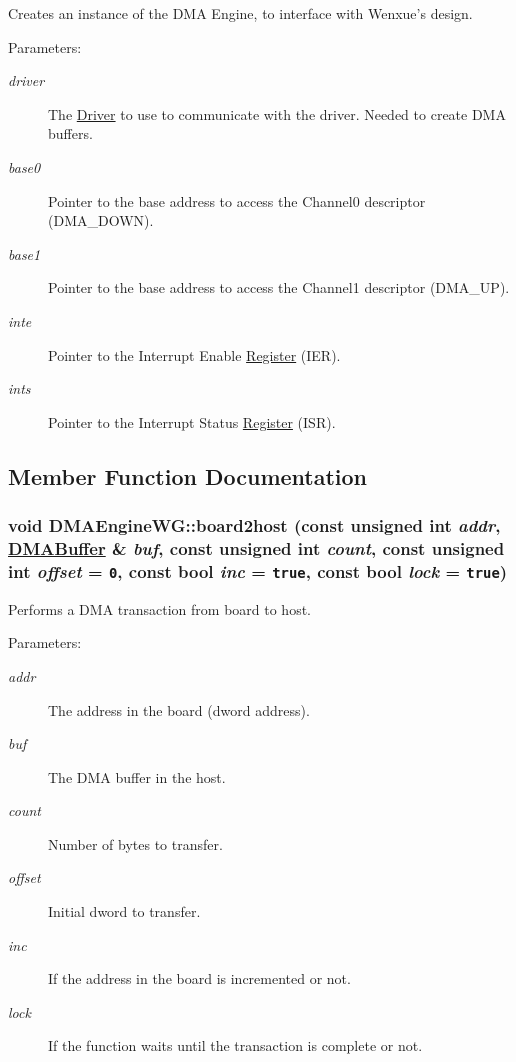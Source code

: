 Creates an instance of the DMA Engine, to interface with Wenxue's design. 

\begin{Desc}
\item[Parameters:]
\begin{description}
\item[{\em driver}]The \hyperlink{classmprace_1_1Driver}{Driver} to use to communicate with the driver. Needed to create DMA buffers. \item[{\em base0}]Pointer to the base address to access the Channel0 descriptor (DMA\_\-DOWN). \item[{\em base1}]Pointer to the base address to access the Channel1 descriptor (DMA\_\-UP). \item[{\em inte}]Pointer to the Interrupt Enable \hyperlink{classmprace_1_1Register}{Register} (IER). \item[{\em ints}]Pointer to the Interrupt Status \hyperlink{classmprace_1_1Register}{Register} (ISR).\end{description}
\end{Desc}


\subsection{Member Function Documentation}
\hypertarget{classmprace_1_1DMAEngineWG_a5}{
\subsubsection[board2host]{\setlength{\rightskip}{0pt plus 5cm}void DMAEngine\-WG::board2host (const unsigned int {\em addr}, \hyperlink{classmprace_1_1DMABuffer}{DMABuffer} \& {\em buf}, const unsigned int {\em count}, const unsigned int {\em offset} = {\tt 0}, const bool {\em inc} = {\tt true}, const bool {\em lock} = {\tt true})}}
\label{classmprace_1_1DMAEngineWG_a5}


Performs a DMA transaction from board to host. 

\begin{Desc}
\item[Parameters:]
\begin{description}
\item[{\em addr}]The address in the board (dword address). \item[{\em buf}]The DMA buffer in the host. \item[{\em count}]Number of bytes to transfer. \item[{\em offset}]Initial dword to transfer. \item[{\em inc}]If the address in the board is incremented or not. \item[{\em lock}]If the function waits until the transaction is complete or not.\end{description}
\end{Desc}


